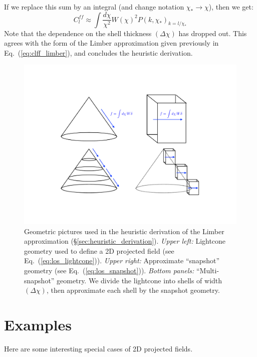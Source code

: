 \documentclass[aps,prd,superscriptaddress,groupedaddress,nofootinbib,nobibnotes]{revtex4}
\newcommand{\be}{\begin{equation}}
\newcommand{\ee}{\end{equation}}
\begin{document}
If we replace this sum by an integral (and change notation $\chi_* \rightarrow \chi$), 
then we get:
\be
C_l^{ff} \approx \int \frac{d\chi}{\chi^2} W(\chi)^2 P(k,\chi_*)_{k=l/\chi_*}
\ee
Note that the dependence on the shell thickness $(\Delta\chi)$ has dropped out.
This agrees with the form of the Limber approximation given previously in Eq.~(\ref{eq:clff_limber}),
and concludes the heuristic derivation.


\begin{figure}
\centerline{\includegraphics[trim={5cm 5cm 5cm 5cm},clip,width=12cm]{figs/limber_lightcone.pdf}}
\caption{Geometric pictures used in the heuristic derivation of the Limber approximation (\S\ref{sec:heuristic_derivation}).
 {\em Upper left:} Lightcone geometry used to define a 2D projected field (see Eq.~(\ref{eq:los_lightcone})).
 {\em Upper right:} Approximate ``snapshot'' geometry (see Eq.~(\ref{eq:los_snapshot})).
 {\em Bottom panels:} ``Multi-snapshot'' geometry.  We divide the lightcone into shells of width $(\Delta\chi)$,
    then approximate each shell by the snapshot geometry.}
\label{fig:limber_lightcone}
\end{figure}

\section{Examples}
\label{sec:examples}

Here are some interesting special cases of 2D projected fields.
\end{document}

